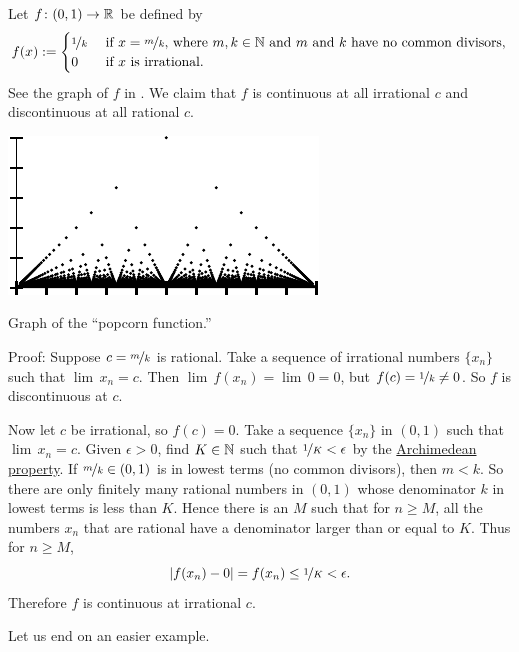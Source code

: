 \begin{example} \label{popcornfunction:example}
Let $f \colon (0,1) \to {\mathbb{R}}$ be defined by
\begin{equation*}
f(x) := 
\begin{cases}
\nicefrac{1}{k} & \text{ if $x=\nicefrac{m}{k}$, where $m,k \in {\mathbb{N}}$
and $m$ and $k$ have no common divisors,} \\
0 & \text{ if $x$ is irrational}.
\end{cases}
\end{equation*}
See the graph of $f$
in .
We claim that
$f$ is continuous at all irrational $c$ and 
discontinuous at all rational $c$.
\begin{myfigureht}
\includegraphics{figures/popcornfig}
\caption{Graph of the ``popcorn function.''\label{popcornfig}}
\end{myfigureht}

Proof:
Suppose $c = \nicefrac{m}{k}$ is rational.  Take a sequence of
irrational numbers $\{ x_n \}$ such that $\lim\, x_n = c$.  Then
$\lim\, f(x_n) = \lim \, 0 = 0$, but $f(c) = \nicefrac{1}{k} \not= 0$.  So $f$
is discontinuous at $c$.

Now let $c$ be irrational, so $f(c) = 0$.  Take a sequence 
$\{ x_n \}$ in $(0,1)$ such that $\lim\, x_n = c$.
Given $\epsilon > 0$, find $K \in {\mathbb{N}}$ such
that $\nicefrac{1}{K} < \epsilon$
by the \hyperref[thm:arch:i]{Archimedean property}.
If $\nicefrac{m}{k} \in (0,1)$ is in lowest terms
(no common divisors), then $m < k$.
So there are only finitely many rational numbers in $(0,1)$
whose denominator $k$ in lowest terms is less than $K$.  Hence
there is an $M$ such that for $n \geq M$, all the numbers $x_n$
that are rational
have a denominator larger than or equal to $K$.  Thus for $n \geq M$,
\begin{equation*}
\left\lvert {f(x_n) - 0} \right\rvert = f(x_n) \leq \nicefrac{1}{K} < \epsilon .
\end{equation*}
Therefore $f$ is continuous at irrational $c$.
\end{example}

Let us end on an easier example.

